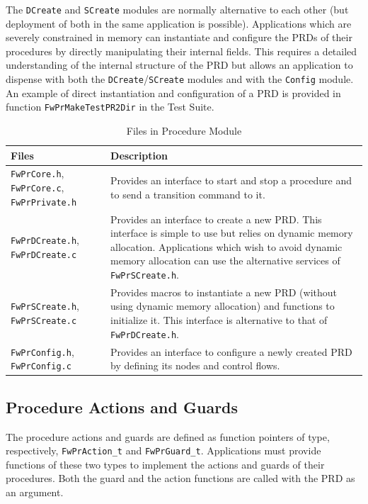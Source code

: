 \documentclass[a4paper,10pt]{article}
\begin{document}
The \texttt{DCreate} and \texttt{SCreate} modules are normally alternative to each other (but deployment of 
both in the same application is possible). Applications which are severely constrained in memory can instantiate 
and configure the PRDs of their procedures by directly manipulating their internal fields. This requires a 
detailed understanding of the internal structure of the PRD but allows an application to dispense with both 
the \texttt{DCreate}/\texttt{SCreate} modules and with the \texttt{Config} module. An example of direct instantiation 
and configuration of a PRD is provided in function \texttt{FwPrMakeTestPR2Dir} in the Test Suite. 

\begin{longtable}{|p{2.5cm}|p{8.7cm}|}
\caption{Files in Procedure Module} \label{tab:prModule} \\
\hline
\rowcolor{gray}
\textbf{Files} & \textbf{Description} \\
\hline\hline
\texttt{FwPrCore.h}, \texttt{FwPrCore.c}, \texttt{FwPrPrivate.h} & Provides an interface to start and stop a procedure and 
to send a transition command to it.\\
\hline
\texttt{FwPrDCreate.h}, \texttt{FwPrDCreate.c} & Provides an interface to create a new PRD. This interface is simple to use 
but relies on dynamic memory allocation. Applications which wish to avoid dynamic memory allocation can use the alternative services of \texttt{FwPrSCreate.h}. \\ 
\hline
\texttt{FwPrSCreate.h}, \texttt{FwPrSCreate.c} & Provides macros to instantiate a new PRD (without using dynamic memory allocation) 
and functions to initialize it. This interface is alternative to that of \texttt{FwPrDCreate.h}. \\ 
\hline
\texttt{FwPrConfig.h}, \texttt{FwPrConfig.c}  & Provides an interface to configure a newly created PRD by defining its nodes and control flows. \\
\hline
\end{longtable}

\subsection{Procedure Actions and Guards}
The procedure actions and guards are defined as function pointers of type, respectively, \texttt{FwPrAction\_t} 
and \texttt{FwPrGuard\_t}. Applications must provide functions of these two types to implement the actions and 
guards of their procedures. Both the guard and the action functions are called with the PRD as an argument.
\end{document}
